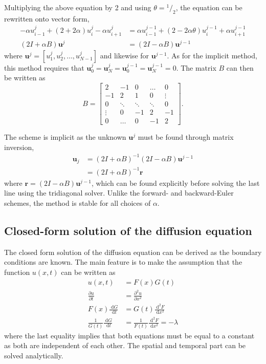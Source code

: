 \documentclass[a4paper,11pt]{article}
\newcommand{\diff}{\ensuremath{\; \text{d}}}
\begin{document}
Multiplying the above equation by 2 and using $\theta = {}^1\!/_2$, the equation can be rewritten onto vector form,
\begin{align*}
    -\alpha u^j_{i-1} + \left( 2 + 2 \alpha \right)u^j_i - \alpha u^j_{i+1}
    &= \alpha u^{j-1}_{i-1} + \left( 2 - 2 \alpha \theta \right)u^{j-1}_i + \alpha u^{j-1}_{i+1} \\
    \left( 2I + \alpha B  \right) \mathbf{u}^j &= 
    \left( 2I - \alpha B  \right) \mathbf{u}^{j-1} 
\end{align*}
where $\mathbf{u}^j = [u^j_1, u^j_2,\dots, u^j_{N-1}]$ and likewise for $\mathbf{u}^{j-1}$. As for the implicit method, this method requires that $\mathbf{u}^j_0 = \mathbf{u}^j_N = \mathbf{u}^{j-1}_0 = \mathbf{u}^{j-1}_N = 0$. The matrix $B$ can then be written as
\[ B = 
    \begin{bmatrix}
        2           & -1     & 0        & \dots     & 0 \\
        -1          & 2      & 1        & 0         & \vdots \\
        0           & \ddots & \ddots   & \ddots    & 0  \\
        \vdots      & 0      &-1        & 2         &-1  \\
        0           & \dots  & 0        &-1         & 2
    \end{bmatrix}.
\]

The scheme is implicit as the unknown $\mathbf{u}^j$ must be found through matrix inversion,
\begin{align*}
    \mathbf{u}_j &= \left( 2I + \alpha B \right)^{-1} \left( 2I -\alpha B \right) \mathbf{u}^{j-1} \\
    &= \left( 2I + \alpha B \right)^{-1} \mathbf{r}
\end{align*}
where $\mathbf{r} = \left( 2I -\alpha B \right) \mathbf{u}^{j-1}$, which can be found explicitly before solving the last line using the tridiagonal solver. Unlike the forward- and backward-Euler schemes, the method is stable for all choices of $\alpha$. 

\subsection{Closed-form solution of the diffusion equation}
The closed form solution of the diffusion equation can be derived as the boundary conditions are known. The main feature is to make the assumption that the function $u(x,t)$ can be written as
\begin{align*}
    u(x,t) &= F(x)G(t) \\
    \frac{\partial u}{\partial t} &= \frac{\partial^2 u}{\partial x^2} \\
    F(x) \frac{\diff G}{\diff t} &= G(t) \frac{\diff^2 F}{\diff x^2} \\
    \frac{1}{G(t)} \frac{\diff G}{\diff t} &= \frac{1}{F(t)} \frac{\diff^2 F}{\diff x^2} = -\lambda
\end{align*}
where the last equality implies that both equations must be equal to a constant as both are independent of each other. The spatial and temporal part can be solved analytically.
\end{document}

